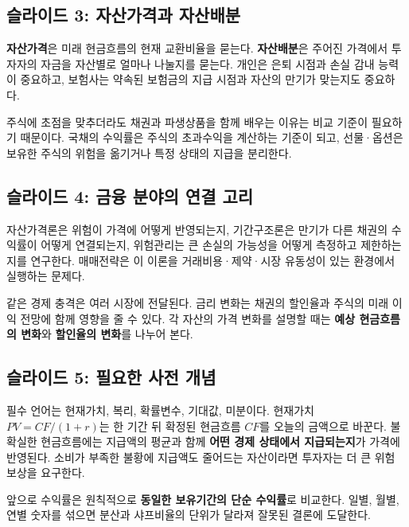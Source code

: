 \documentclass[11pt,a4paper]{article}
\begin{document}
\subsection{슬라이드 3: 자산가격과 자산배분}

\textbf{자산가격}은 미래 현금흐름의 현재 교환비율을 묻는다. \textbf{자산배분}은 주어진 가격에서 투자자의 자금을 자산별로 얼마나 나눌지를 묻는다. 개인은 은퇴 시점과 손실 감내 능력이 중요하고, 보험사는 약속된 보험금의 지급 시점과 자산의 만기가 맞는지도 중요하다.
\par

주식에 초점을 맞추더라도 채권과 파생상품을 함께 배우는 이유는 비교 기준이 필요하기 때문이다. 국채의 수익률은 주식의 초과수익을 계산하는 기준이 되고, 선물·옵션은 보유한 주식의 위험을 옮기거나 특정 상태의 지급을 분리한다.
\par

\subsection{슬라이드 4: 금융 분야의 연결 고리}

자산가격론은 위험이 가격에 어떻게 반영되는지, 기간구조론은 만기가 다른 채권의 수익률이 어떻게 연결되는지, 위험관리는 큰 손실의 가능성을 어떻게 측정하고 제한하는지를 연구한다. 매매전략은 이 이론을 거래비용·제약·시장 유동성이 있는 환경에서 실행하는 문제다.
\par

같은 경제 충격은 여러 시장에 전달된다. 금리 변화는 채권의 할인율과 주식의 미래 이익 전망에 함께 영향을 줄 수 있다. 각 자산의 가격 변화를 설명할 때는 \textbf{예상 현금흐름의 변화}와 \textbf{할인율의 변화}를 나누어 본다.
\par

\subsection{슬라이드 5: 필요한 사전 개념}

필수 언어는 현재가치, 복리, 확률변수, 기대값, 미분이다. 현재가치 $PV=CF/(1+r)$는 한 기간 뒤 확정된 현금흐름 $CF$를 오늘의 금액으로 바꾼다. 불확실한 현금흐름에는 지급액의 평균과 함께 \textbf{어떤 경제 상태에서 지급되는지}가 가격에 반영된다. 소비가 부족한 불황에 지급액도 줄어드는 자산이라면 투자자는 더 큰 위험 보상을 요구한다.
\par

앞으로 수익률은 원칙적으로 \textbf{동일한 보유기간의 단순 수익률}로 비교한다. 일별, 월별, 연별 숫자를 섞으면 분산과 샤프비율의 단위가 달라져 잘못된 결론에 도달한다.
\par
\end{document}
